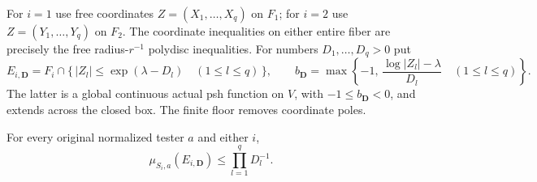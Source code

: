 For $i=1$ use free coordinates $Z=(X_1,\ldots,X_q)$ on $F_1$;
for $i=2$ use $Z=(Y_1,\ldots,Y_q)$ on $F_2$.
The coordinate inequalities on either entire fiber are precisely
the free radius-$r^{-1}$ polydisc inequalities. For numbers
$D_1,\ldots,D_q>0$ put
\[
 E_{i,\mathbf D}
   =F_i\cap\{\,|Z_l|\le\exp(\lambda-D_l)\quad(1\le l\le q)\,\},
 \qquad
 b_{\mathbf D}
   =\max\left\{-1,\,
           \frac{\log|Z_l|-\lambda}{D_l}\quad(1\le l\le q)\right\}.
 \tag{CO4}
\]
The latter is a global continuous actual psh function on $V$,
with $-1\le b_{\mathbf D}<0$, and extends across the closed box.
The finite floor removes coordinate poles.

\begin{lemma}
For every original normalized tester $a$ and either $i$,
\[
       \mu_{S_i,a}(E_{i,\mathbf D})
                            \le\prod_{l=1}^qD_l^{-1}.
 \tag{CO5}
\]
\end{lemma}

